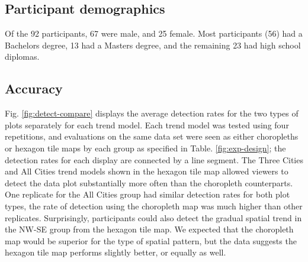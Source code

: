 \documentclass[journal]{vgtc}                     %
\begin{document}
\hypertarget{participant-demographics}{%
\subsection{Participant demographics}\label{participant-demographics}}

Of the 92 participants, 67 were male, and 25 female. Most participants (56) had a Bachelors degree, 13 had a Masters degree, and the remaining 23 had high school diplomas.

\hypertarget{accuracy}{%
\subsection{Accuracy}\label{accuracy}}

Fig. \ref{fig:detect-compare} displays the average detection rates for the two types of plots separately for each trend model. Each trend model was tested using four repetitions, and evaluations on the same data set were seen as either choropleths or hexagon tile maps by each group as specified in Table. \ref{fig:exp-design}; the detection rates for each display are connected by a line segment. The Three Cities and All Cities trend models shown in the hexagon tile map allowed viewers to detect the data plot substantially more often than the choropleth counterparts. One replicate for the All Cities group had similar detection rates for both plot types, the rate of detection using the choropleth map was much higher than other replicates. Surprisingly, participants could also detect the gradual spatial trend in the NW-SE group from the hexagon tile map. We expected that the choropleth map would be superior for the type of spatial pattern, but the data suggests the hexagon tile map performs slightly better, or equally as well.
\end{document}

